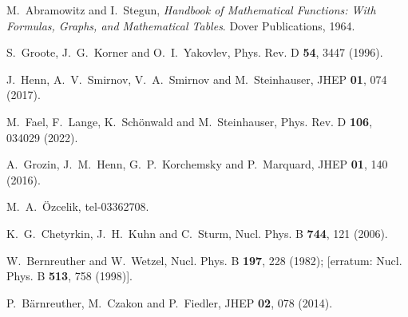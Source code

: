 \documentclass[onecolumn,preprintnumbers,aps,superscriptaddress,nofootinbib,prd,notitlepage]{revtex4-1}
\begin{document}
{\begin{thebibliography}{99}
M.~Abramowitz and I.~Stegun, {\em Handbook of Mathematical Functions: With
	Formulas, Graphs, and Mathematical Tables}.  \newblock Dover Publications, 1964.

S.~Groote, J.~G.~Korner and O.~I.~Yakovlev,
Phys. Rev. D \textbf{54}, 3447  (1996).

J.~Henn, A.~V.~Smirnov, V.~A.~Smirnov and M.~Steinhauser,
JHEP \textbf{01}, 074 (2017).

M.~Fael, F.~Lange, K.~Sch\"onwald and M.~Steinhauser,
Phys. Rev. D \textbf{106},  034029 (2022).

A.~Grozin, J.~M.~Henn, G.~P.~Korchemsky and P.~Marquard,
JHEP \textbf{01}, 140 (2016).

M.~A.~\"Ozcelik,
tel-03362708.

K.~G.~Chetyrkin, J.~H.~Kuhn and C.~Sturm,
Nucl. Phys. B \textbf{744}, 121  (2006).

W.~Bernreuther and W.~Wetzel,
Nucl. Phys. B \textbf{197}, 228 (1982); [erratum: Nucl. Phys. B \textbf{513}, 758 (1998)].

P.~B\"arnreuther, M.~Czakon and P.~Fiedler,
JHEP \textbf{02}, 078 (2014).



\end{thebibliography}}
\end{document}
